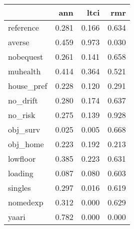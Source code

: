 \begin{tabular}{lrrr}
\toprule
{} &    ann &   ltci &    rmr \\
\midrule
reference  &  0.281 &  0.166 &  0.634 \\
averse     &  0.459 &  0.973 &  0.030 \\
nobequest  &  0.261 &  0.141 &  0.658 \\
muhealth   &  0.414 &  0.364 &  0.521 \\
house\_pref &  0.228 &  0.120 &  0.291 \\
no\_drift   &  0.280 &  0.174 &  0.637 \\
no\_risk    &  0.275 &  0.139 &  0.928 \\
obj\_surv   &  0.025 &  0.005 &  0.668 \\
obj\_home   &  0.223 &  0.192 &  0.213 \\
lowfloor   &  0.385 &  0.223 &  0.631 \\
loading    &  0.087 &  0.080 &  0.603 \\
singles    &  0.297 &  0.016 &  0.619 \\
nomedexp   &  0.312 &  0.000 &  0.629 \\
yaari      &  0.782 &  0.000 &  0.000 \\
\bottomrule
\end{tabular}

